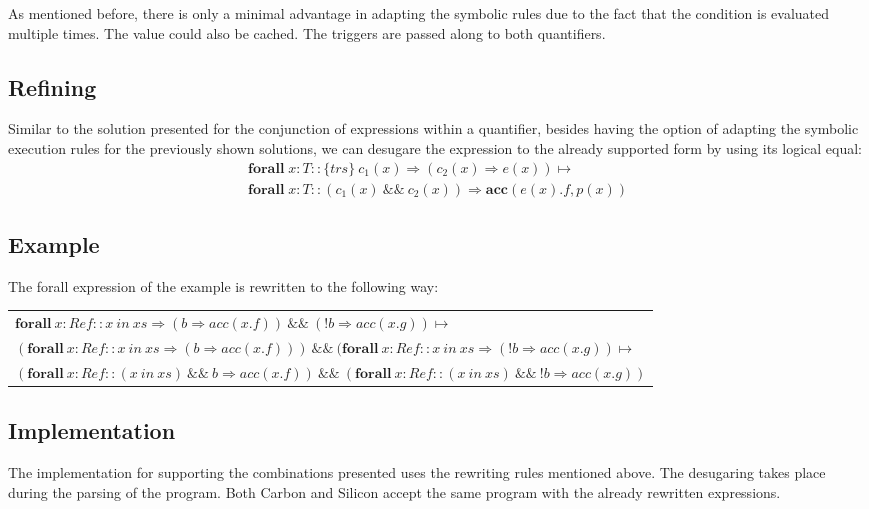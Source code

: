 \documentclass[12pt]{article}
\begin{document}
As mentioned before, there is only a minimal advantage in adapting the symbolic rules due to the fact that the condition is evaluated multiple times. The value could also be cached. The triggers are passed along to both quantifiers.

\subsection{Refining}
Similar to the solution presented for the conjunction of expressions within a quantifier, besides having the option of adapting the symbolic execution rules for the previously shown solutions, we can desugare the expression to the already supported form by using its logical equal:
\begin{equation}
\begin{aligned}
	\mathbf{forall} \; x:T ::  \{trs\}\ c_1(x) \Rightarrow (c_2(x) \Rightarrow e(x))  \mapsto \\
	\mathbf{forall} \; x:T ::( c_1(x) \:\&\&\: c_2(x)) \Rightarrow \mathbf{acc}(e(x).f, p(x))
\end{aligned}
\end{equation}

\subsection{Example}
The forall expression of the example is rewritten to the following way: \\

\begin{tabularx}{1\textwidth}{ X }
\(\mathbf{forall\ } x:Ref :: x\ in\ xs \Rightarrow (b \Rightarrow  acc(x.f)) \:\&\&\ (!b \Rightarrow acc(x.g)) \mapsto \) \\
\((\mathbf{forall\ } x:Ref :: x\ in\ xs \Rightarrow (b \Rightarrow  acc(x.f))) \:\&\&\ (\mathbf{forall\ } x:Ref :: x\ in\ xs \Rightarrow (!b \Rightarrow acc(x.g)) \mapsto \) \\
\((\mathbf{forall\ } x:Ref :: (x\ in\ xs)  \:\&\&\ b \Rightarrow acc(x.f)) \:\&\&\ (\mathbf{forall\ } x:Ref :: (x\ in\ xs)  \:\&\&\ !b \Rightarrow  acc(x.g)) \) \\
\end{tabularx}


\subsection{Implementation}
The implementation for supporting the combinations presented uses the rewriting rules mentioned above. The desugaring takes place during the parsing of the program. Both Carbon and Silicon accept the same program with the already rewritten expressions.
\end{document}
